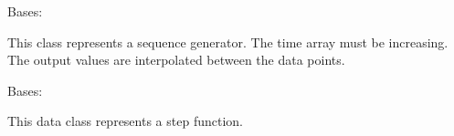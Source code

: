 \documentclass[letterpaper,10pt,english]{sphinxmanual}
\begin{document}
\begin{fulllineitems}
\label{\detokenize{helpers:helpers.Sequence}}
\pysigstartsignatures
{}
\pysigstopsignatures
\sphinxAtStartPar
Bases: 

\sphinxAtStartPar
This class represents a sequence generator. The time array must be
increasing. The output values are interpolated between the data points.

\end{fulllineitems}


\begin{fulllineitems}
\label{\detokenize{helpers:helpers.Step}}
\pysigstartsignatures
{}
\pysigstopsignatures
\sphinxAtStartPar
Bases: 

\sphinxAtStartPar
This data class represents a step function.

\end{fulllineitems}

\end{document}

